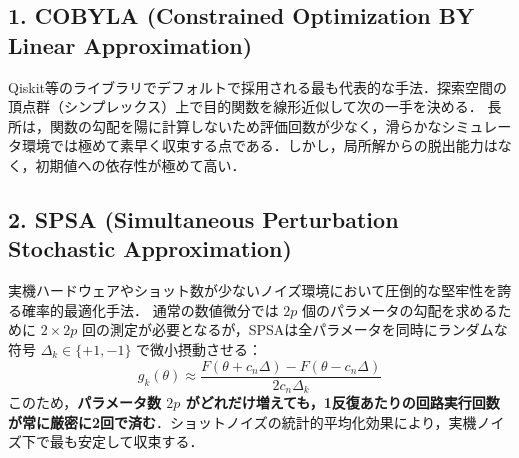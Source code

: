 \documentclass[11pt,a4paper,oneside,openany]{ltjsbook}
\theoremstyle{definition}
\theoremstyle{plain}
\theoremstyle{remark}
\begin{document}
\begin{table}[htbp]
\centering
\caption{QAOAに適用される主要古典オプティマイザの比較}
\label{tab:optimizers}
\vspace{-2mm}
\end{table}

\subsection{1. COBYLA (Constrained Optimization BY Linear Approximation) \cite{powell1994direct}}
Qiskit等のライブラリでデフォルトで採用される最も代表的な手法．探索空間の頂点群（シンプレックス）上で目的関数を線形近似して次の一手を決める．
長所は，関数の勾配を陽に計算しないため評価回数が少なく，滑らかなシミュレータ環境では極めて素早く収束する点である．しかし，局所解からの脱出能力はなく，初期値への依存性が極めて高い．

\subsection{2. SPSA (Simultaneous Perturbation Stochastic Approximation) \cite{spall1992multivariate}}
実機ハードウェアやショット数が少ないノイズ環境において圧倒的な堅牢性を誇る確率的最適化手法．
通常の数値微分では $2p$ 個のパラメータの勾配を求めるために $2 \times 2p$ 回の測定が必要となるが，SPSAは全パラメータを同時にランダムな符号 $\Delta_k \in \{+1, -1\}$ で微小摂動させる：
\begin{equation}
    g_k(\theta) \approx \frac{F(\theta + c_n \Delta) - F(\theta - c_n \Delta)}{2 c_n \Delta_k}
\end{equation}
このため，\textbf{パラメータ数 $2p$ がどれだけ増えても，1反復あたりの回路実行回数が常に厳密に2回で済む}．ショットノイズの統計的平均化効果により，実機ノイズ下で最も安定して収束する．
\end{document}
